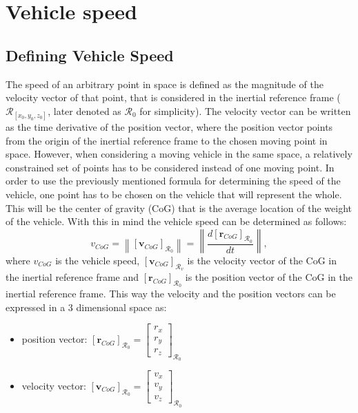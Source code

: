 \chapter{Vehicle speed}

\section{Defining Vehicle Speed}

The speed of an arbitrary point in space is defined as the magnitude of the velocity vector of that point, that is considered in the inertial reference frame ($\mathcal{R}_{[x_0, y_0, z_0]}$, later denoted as $\mathcal{R}_0$ for simplicity). The velocity vector can be written as the time derivative of the position vector, where the position vector points from the origin of the inertial reference frame to the chosen moving point in space. However, when considering a moving vehicle in the same space, a relatively constrained set of points has to be considered instead of one moving point. In order to use the previously mentioned formula for determining the speed of the vehicle, one point has to be chosen on the vehicle that will represent the whole. This will be the center of gravity (CoG) that is the average location of the weight of the vehicle. With this in mind the vehicle speed can be determined as follows:
\begin{equation}
    v_{CoG} = \left\| [\textbf{v}_{CoG}]_{\mathcal{R}_0} \right\| = \left\| \frac{d [\textbf{r}_{CoG}]_{\mathcal{R}_0}}{dt} \right\|, 
\end{equation}
where $v_{CoG}$ is the vehicle speed, $[\textbf{v}_{CoG}]_{\mathcal{R}_v}$ is the velocity vector of the CoG in the inertial reference frame and $[\textbf{r}_{CoG}]_{\mathcal{R}_0}$ is the position vector of the CoG in the inertial reference frame. This way the velocity and the position vectors can be expressed in a 3 dimensional space as:
\begin{itemize}
    \item position vector: $[\textbf{r}_{CoG}]_{\mathcal{R}_0} = \begin{bmatrix} r_x \\ r_y \\ r_z \end{bmatrix}_{\mathcal{R}_0}$
    \item velocity vector: $[\textbf{v}_{CoG}]_{\mathcal{R}_0} = \begin{bmatrix} v_x \\ v_y \\ v_z \end{bmatrix}_{\mathcal{R}_0}$
\end{itemize}


